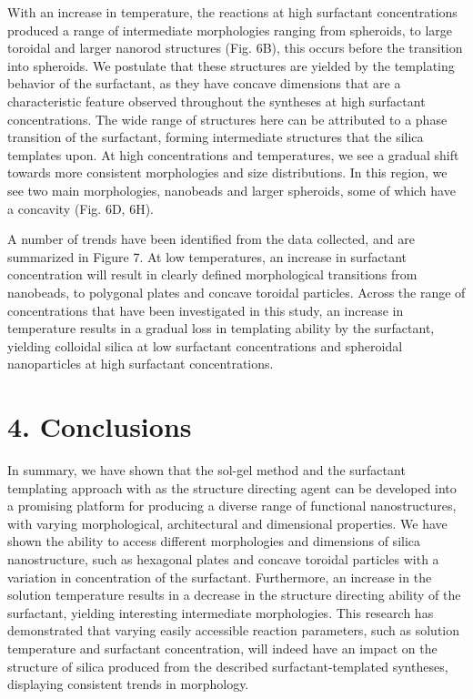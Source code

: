 \documentclass[a4paper,12pt,twocolumn]{article}
\begin{document}
  	With an increase in temperature, the reactions at high surfactant concentrations produced a range of intermediate morphologies ranging from spheroids, to large toroidal and larger nanorod structures (Fig. 6B), this occurs before the transition into spheroids. We postulate that these structures are yielded by the templating behavior of the surfactant, as they have concave dimensions that are a characteristic feature observed throughout the syntheses at high surfactant concentrations. The wide range of structures here can be attributed to a phase transition of the surfactant, forming intermediate structures that the silica templates upon. At high concentrations and temperatures, we see a gradual shift towards more consistent morphologies and size distributions. In this region, we see two main morphologies, nanobeads and larger spheroids, some of which have a concavity (Fig. 6D, 6H).
  	
  	A number of trends have been identified from the data collected, and are summarized in Figure 7. At low temperatures, an increase in surfactant concentration will result in clearly defined morphological transitions from nanobeads, to polygonal plates and concave toroidal particles. Across the range of concentrations that have been investigated in this study, an increase in temperature results in a gradual loss in templating ability by the surfactant, yielding colloidal silica at low surfactant concentrations and spheroidal nanoparticles at high surfactant concentrations.
	 
	 \section{4. Conclusions}
	 
	 In summary, we have shown that the sol-gel method and the surfactant templating approach with  as the structure directing agent can be developed into a promising platform for producing a diverse range of functional nanostructures, with varying morphological, architectural and dimensional properties. We have shown the ability to access different morphologies and dimensions of silica nanostructure, such as hexagonal plates and concave toroidal particles with a variation in concentration of the  surfactant. Furthermore, an increase in the solution temperature results in a decrease in the structure directing ability of the surfactant, yielding interesting intermediate morphologies. This research has demonstrated that varying easily accessible reaction parameters, such as solution temperature and surfactant concentration, will indeed have an impact on the structure of silica produced from the described surfactant-templated syntheses, displaying consistent trends in morphology. 
	 
\end{document}
